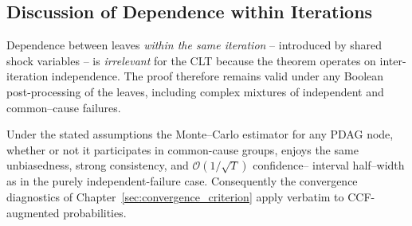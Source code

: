 \subsection{Discussion of Dependence within Iterations}
Dependence between leaves \emph{within the same iteration} – introduced by
shared shock variables – is \emph{irrelevant} for the CLT because the theorem
operates on inter-iteration independence.  The proof therefore remains valid
under any Boolean post-processing of the leaves, including complex mixtures of
independent and common–cause failures.

Under the stated assumptions the Monte–Carlo estimator for any PDAG node,
whether or not it participates in common-cause groups, enjoys the same
unbiasedness, strong consistency, and $\mathcal{O}(1/\sqrt{T})$ confidence–
interval half–width as in the purely independent-failure case.  Consequently
the convergence diagnostics of Chapter~\ref{sec:convergence_criterion} apply
verbatim to CCF-augmented probabilities.
